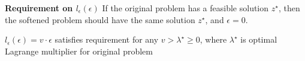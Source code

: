 \textbf{Requirement on $l_\epsilon(\epsilon)$}
If the original problem has a feasible solution $z^\star$,
then the softened problem should have the same solution $z^\star$,
and $\epsilon = 0$.

\begin{theorem}
	$l_\epsilon(\epsilon) = v \cdot \epsilon$ satisfies requirement for any $v > \lambda^\star \geq 0$,
	where $\lambda^\star$ is optimal Lagrange multiplier for original problem
\end{theorem}
